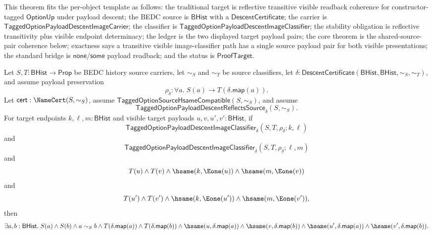 \begin{theorem}
\label{thm:tagged-option-payload-descent-image-classifier-reflective-transitive-visible-pair-coherence}
This theorem fits the per-object template as follows: the traditional target is
reflective transitive visible readback coherence for constructor-tagged
$\mathsf{OptionUp}$ under payload descent; the BEDC source is $\mathsf{BHist}$
with a $\mathsf{DescentCertificate}$; the carrier is
$\mathsf{TaggedOptionPayloadDescentImageCarrier}$; the classifier is
$\mathsf{TaggedOptionPayloadDescentImageClassifier}$; the stability obligation
is reflective transitivity plus visible endpoint determinacy; the ledger is the
two displayed target payload pairs; the core theorem is the shared-source-pair
coherence below; exactness says a transitive visible image-classifier path has a
single source payload pair for both visible presentations; the standard bridge
is $\mathsf{none}$/$\mathsf{some}$ payload readback; and the status is
$\mathsf{ProofTarget}$.

Let $S,T:\mathsf{BHist}\to\mathsf{Prop}$ be BEDC history source carriers, let
$\sim_S$ and $\sim_T$ be source classifiers, let
$\delta:\mathsf{DescentCertificate}(\mathsf{BHist},\mathsf{BHist},\sim_S,\sim_T)$,
and assume payload preservation
$$
\rho_{\delta}:\forall a.\;S(a)\to T(\delta.\mathsf{map}(a)).
$$
Let $\mathsf{cert}:\NameCert(S,\sim_S)$, assume
$\mathsf{TaggedOptionSourceHsameCompatible}(S,\sim_S)$, and assume
$$
\mathsf{TaggedOptionPayloadDescentReflectsSource}_{\delta}(S,\sim_S).
$$
For target endpoints $k,\ell,m:\mathsf{BHist}$ and visible target payloads
$u,v,u',v':\mathsf{BHist}$, if
$$
\mathsf{TaggedOptionPayloadDescentImageClassifier}_{\delta}
(S,T,\rho_{\delta};k,\ell)
$$
and
$$
\mathsf{TaggedOptionPayloadDescentImageClassifier}_{\delta}
(S,T,\rho_{\delta};\ell,m)
$$
and
$$
T(u)\land T(v)\land
\hsame(k,\Eone(u))\land
\hsame(m,\Eone(v))
$$
and
$$
T(u')\land T(v')\land
\hsame(k,\Eone(u'))\land
\hsame(m,\Eone(v')),
$$
then
$$
\exists a,b:\mathsf{BHist}.\;
S(a)\land S(b)\land a\sim_S b\land
T(\delta.\mathsf{map}(a))\land T(\delta.\mathsf{map}(b))\land
\hsame(u,\delta.\mathsf{map}(a))\land
\hsame(v,\delta.\mathsf{map}(b))\land
\hsame(u',\delta.\mathsf{map}(a))\land
\hsame(v',\delta.\mathsf{map}(b)).
$$
\end{theorem}

